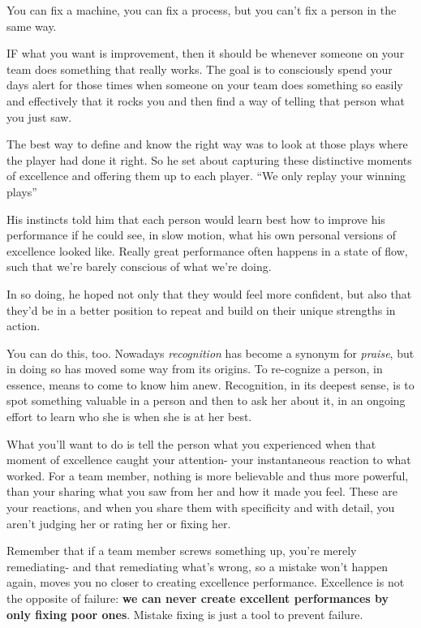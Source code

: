 \documentclass[ebook,12pt,oneside,openany]{memoir}
\begin{document}
You can fix a machine, you can fix a process, but you can't fix a person in the same way.

IF what you want is improvement, then it should be whenever someone on your team does something that really works.
The goal is to consciously spend your days alert for those times when someone on your team does something so easily and 
effectively that it rocks you and then find a way of telling that person what you just saw.

The best way to define and know the right way was to look at those plays where the player had done it right.
So he set about capturing these distinctive moments of excellence and offering them up to each player. 
``We only replay your winning plays''

His instincts told him that each person would learn best how to improve his performance 
if he could see, in slow motion, what his own personal versions of excellence looked like. 
Really great performance often happens in a state of flow, such that we're barely conscious of what we're doing.

In so doing, he hoped not only that they would feel more confident, but also that they'd be in a better position to 
repeat and build on their unique strengths in action. 

You can do this, too. Nowadays \textit{recognition} has become a synonym for \textit{praise},
but in doing so has moved some way from its origins.
To re-cognize a person, in essence, means to come to know him anew.
Recognition, in its deepest sense, is to spot something valuable in a person and 
then to ask her about it, in an ongoing effort to learn who she is when she is at her best. 

What you'll want to do is tell the person what you experienced when that moment of excellence caught your attention-
your instantaneous reaction to what worked. 
For a team member, nothing is more believable and thus more powerful, than your sharing what you saw from her 
and how it made you feel.
These are your reactions, and when you share them with specificity and with detail, you aren't judging her or 
rating her or fixing her. 

Remember that if a team member screws something up, you're merely remediating-
and that remediating what's wrong, so a mistake won't happen again, moves you no closer to creating excellence performance.
Excellence is not the opposite of failure: \textbf{we can never create excellent performances by only fixing poor ones}.
Mistake fixing is just a tool to prevent failure.
\end{document}
